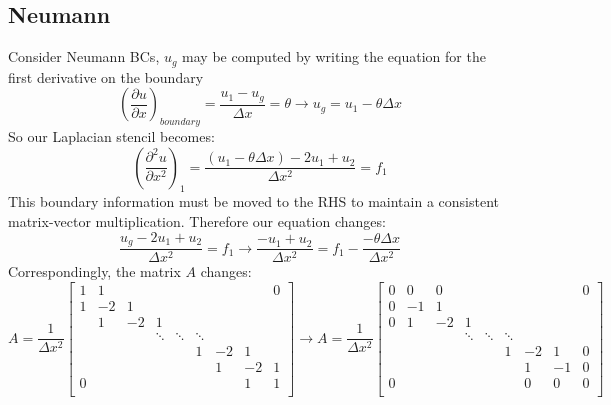 \documentclass[landscape]{article}
\begin{document}
\subsection{Neumann}
Consider Neumann BCs, $u_g$ may be computed by writing the equation for the first derivative on the boundary
\begin{equation}
  \left(\frac{\partial u}{\partial x}\right)_{boundary}
  = \frac{u_1 - u_g}{\Delta x} = \theta
  \rightarrow
  u_g = u_1 - \theta \Delta x
\end{equation}
So our Laplacian stencil becomes:
\begin{equation}
   \left(\frac{\partial^2 u}{\partial x^2}\right)_{1} = 
   \frac{(u_1 - \theta \Delta x) - 2 u_1 + u_{2}}{\Delta x^2} = f_1
\end{equation}
This boundary information must be moved to the RHS to maintain a consistent matrix-vector multiplication. Therefore our equation changes:
\begin{equation}
   \frac{u_g - 2 u_1 + u_{2}}{\Delta x^2} = f_1
   \rightarrow
   \frac{- u_1 + u_{2}}{\Delta x^2} = f_1 - \frac{-\theta \Delta x}{\Delta x^2}
\end{equation}
Correspondingly, the matrix $A$ changes:
\[ A = \frac{1}{\Delta x^2} \left[\begin{array}{ccccccccc}
1  & 1     &           &           &           &           &           &         &  0 \\
1  & -2    & 1         &           &           &           &           &         &    \\
   & 1     & -2        & 1         &           &           &           &         &    \\
   &       &           & \ddots    & \ddots    & \ddots    &           &         &    \\
   &       &           &           &           & 1         & -2        & 1       &    \\
   &       &           &           &           &           &  1        & -2      &  1 \\
0  &       &           &           &           &           &           & 1       &  1 \\
\end{array} \right]
\rightarrow
A = \frac{1}{\Delta x^2} \left[\begin{array}{ccccccccc}
0  & 0     & 0         &           &           &           &           &         &  0 \\
0  & -1    & 1         &           &           &           &           &         &    \\
0  & 1     & -2        & 1         &           &           &           &         &    \\
   &       &           & \ddots    & \ddots    & \ddots    &           &         &    \\
   &       &           &           &           & 1         & -2        & 1       &  0 \\
   &       &           &           &           &           &  1        & -1      &  0 \\
0  &       &           &           &           &           &  0        & 0       &  0 \\
\end{array} \right]
\]
\end{document}
